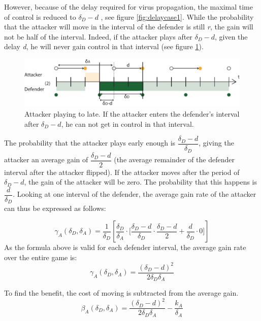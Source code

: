 However, because of the delay required for virus propagation, the maximal time of control is reduced to $\delta_{D}-d$ , see figure \ref{fig:delaycase1}. While the probability that the attacker will move in the interval of the defender is still \textit{r}, the gain will not be half of the interval. Indeed, if the attacker plays after $\delta_{D}-d$, given the delay \textit{d}, he will never gain control in that interval (see figure \ref{tijdens interval}). 
\begin{figure}[hbtp]
\centering
\includegraphics[scale=0.7]{../../doc/template/Images/delaydtijdens.pdf}
\caption{Attacker playing to late. If the attacker enters the defender's interval after $\delta_{D} -d$, he can not get in control in that interval.}
\label{tijdens interval}
\end{figure}The probability that the attacker plays early enough is $\dfrac{\delta_{D}-d}{\delta_{D}}$, giving the attacker an average gain of $\dfrac{\delta_{D}-d}{2}$ (the average remainder of the defender interval after the attacker flipped). If the attacker moves after the period of $\delta_{D}-d$, the gain of the attacker will be zero. The probability that this happens is  $\dfrac{d}{\delta_{D}}$. Looking at one interval of the defender, the average gain rate of the attacker can thus be expressed as follows:


\begin{equation*}
\gamma_{A}(\delta_{D},\delta_{A}) = \dfrac {1}{\delta_{D}} [ \dfrac{\delta_{D}}{\delta_{A}} \cdot \big[ \dfrac{\delta_{D}-d}{\delta_{D}} \cdot \dfrac{\delta_{D}-d}{2} + \dfrac{d}{\delta_{D}} \cdot 0 \big] ]
\end{equation*}
As the formula above is valid for each defender interval, the average gain rate over the entire game is:
\begin{equation*}
\gamma_{A}(\delta_{D},\delta_{A}) = \dfrac{(\delta_{D} -d)^{2}}{2\delta_{D}\delta_{A}}
\end{equation*}

To find the benefit, the cost of moving is subtracted from the average gain. 
\begin{equation}
\beta_{A}(\delta_{D},\delta_{A}) = \dfrac { (\delta_{D}-d) ^{2}} {2 \delta_{D}  \delta_{A}} - \dfrac{k_{A}}{\delta_{A}}
\label{Benfcase1:attacker}
\end{equation}

